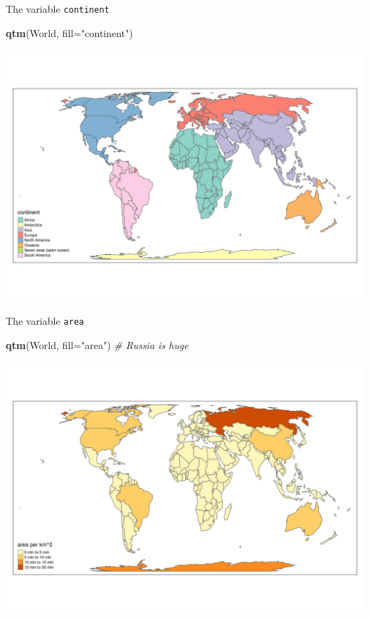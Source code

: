 \documentclass[
  ignorenonframetext,
]{beamer}
\newenvironment{Shaded}{\begin{snugshade}}{\end{snugshade}}
\newcommand{\CommentTok}[1]{\textcolor[rgb]{0.56,0.35,0.01}{\textit{#1}}}
\newcommand{\DataTypeTok}[1]{\textcolor[rgb]{0.13,0.29,0.53}{#1}}
\newcommand{\KeywordTok}[1]{\textcolor[rgb]{0.13,0.29,0.53}{\textbf{#1}}}
\newcommand{\NormalTok}[1]{#1}
\newcommand{\StringTok}[1]{\textcolor[rgb]{0.31,0.60,0.02}{#1}}
\begin{document}
\begin{frame}[fragile]{The variable \texttt{continent}}
\protect\hypertarget{the-variable-continent}{}
\begin{Shaded}
\begin{Highlighting}[]
\KeywordTok{qtm}\NormalTok{(World, }\DataTypeTok{fill=}\StringTok{"continent"}\NormalTok{)}
\end{Highlighting}
\end{Shaded}

\includegraphics{quick_high_quality_maps_files/figure-beamer/unnamed-chunk-7-1.pdf}
\end{frame}

\begin{frame}[fragile]{The variable \texttt{area}}
\protect\hypertarget{the-variable-area}{}
\begin{Shaded}
\begin{Highlighting}[]
\KeywordTok{qtm}\NormalTok{(World, }\DataTypeTok{fill=}\StringTok{"area"}\NormalTok{) }\CommentTok{\# Russia is huge}
\end{Highlighting}
\end{Shaded}

\includegraphics{quick_high_quality_maps_files/figure-beamer/unnamed-chunk-9-1.pdf}
\end{frame}
\end{document}
